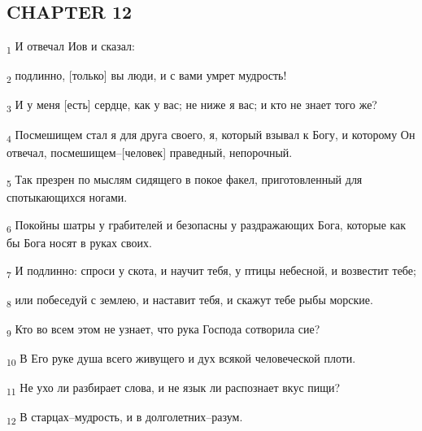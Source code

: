 \subsection{CHAPTER 12}
\begin{tcolorbox}
\textsubscript{1} И отвечал Иов и сказал:
\end{tcolorbox}
\begin{tcolorbox}
\textsubscript{2} подлинно, [только] вы люди, и с вами умрет мудрость!
\end{tcolorbox}
\begin{tcolorbox}
\textsubscript{3} И у меня [есть] сердце, как у вас; не ниже я вас; и кто не знает того же?
\end{tcolorbox}
\begin{tcolorbox}
\textsubscript{4} Посмешищем стал я для друга своего, я, который взывал к Богу, и которому Он отвечал, посмешищем--[человек] праведный, непорочный.
\end{tcolorbox}
\begin{tcolorbox}
\textsubscript{5} Так презрен по мыслям сидящего в покое факел, приготовленный для спотыкающихся ногами.
\end{tcolorbox}
\begin{tcolorbox}
\textsubscript{6} Покойны шатры у грабителей и безопасны у раздражающих Бога, которые как бы Бога носят в руках своих.
\end{tcolorbox}
\begin{tcolorbox}
\textsubscript{7} И подлинно: спроси у скота, и научит тебя, у птицы небесной, и возвестит тебе;
\end{tcolorbox}
\begin{tcolorbox}
\textsubscript{8} или побеседуй с землею, и наставит тебя, и скажут тебе рыбы морские.
\end{tcolorbox}
\begin{tcolorbox}
\textsubscript{9} Кто во всем этом не узнает, что рука Господа сотворила сие?
\end{tcolorbox}
\begin{tcolorbox}
\textsubscript{10} В Его руке душа всего живущего и дух всякой человеческой плоти.
\end{tcolorbox}
\begin{tcolorbox}
\textsubscript{11} Не ухо ли разбирает слова, и не язык ли распознает вкус пищи?
\end{tcolorbox}
\begin{tcolorbox}
\textsubscript{12} В старцах--мудрость, и в долголетних--разум.
\end{tcolorbox}
